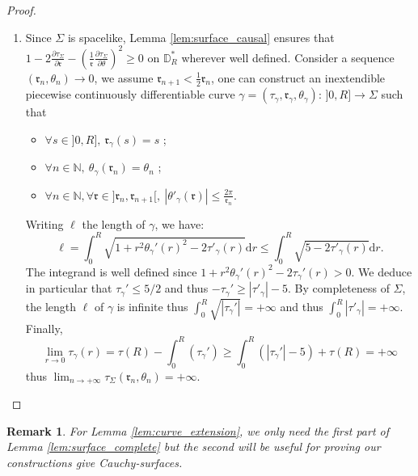 \documentclass[a4paper,12pt]{article}
\def\r{\mathfrak{r}}
\def\N{\mathbb N}
\def\d{\mathrm{d}}
\newtheorem{remark}{Remark}             %
\begin{document}
\begin{proof}
\begin{enumerate}
	
     
   \item    Since $\Sigma$ is spacelike,  Lemma \ref{lem:surface_causal} ensures that 
      $1-2\frac{\partial \tau_\Sigma}{\partial \r}-
      \left(\frac{1}{\r} \frac{\partial \tau_\Sigma}{\partial \theta}\right)^2 \geq 0$
      on $\mathbb D_R^*$ wherever well defined. Consider a sequence $(\r_n,\theta_n)\rightarrow 0$, we assume $\r_{n+1}<\frac{1}{2}\r_{n}$, one can construct
      an inextendible piecewise continuously differentiable curve $\gamma=(\tau_\gamma,\r_\gamma,\theta_\gamma):\,]0,R]\xrightarrow{~~} \Sigma$ such that
      \begin{itemize}
       \item  $\forall s\in ]0,R],~\r_\gamma(s)=s$ ;
       \item  $\forall n\in \N,~\theta_\gamma(\r_n)=\theta_n$ ;
       \item  $\forall n\in\N, \forall \r\in ]\r_n,\r_{n+1}[,~ |\theta'_\gamma(\r)|\leq \frac{2\pi}{\r_n} $.
      \end{itemize}		
      Writing $\ell$ the length of $\gamma$, we have:
      $$
      \ell = \int_{0}^{R} \sqrt{1+r^2\theta_\gamma'(r)^2-2 \tau'_\gamma(r)}\d r
       \leq  \int_{0}^{R} \sqrt{5-2 \tau'_\gamma(r)} \d r .
      $$
      The integrand is well defined since  $1+r^2\theta_\gamma'(r)^2-2 \tau_\gamma'(r)>0$. 
      We deduce in particular that $\tau_\gamma'\leq 5/2$ and thus $-\tau_\gamma'\geq |\tau'_\gamma|-5$. By completeness of $\Sigma$, the length $\ell$ of $\gamma$ is infinite thus 
      $\int_{0}^{R}\sqrt{|\tau_\gamma'|}=+\infty$ and thus $\int_0^{R}|\tau'_\gamma|=+\infty$.
      Finally, 
      $$\lim_{r\rightarrow 0}\tau_\gamma (r)=\tau(R)-\int_0^R\left(\tau_\gamma'\right) \geq \int_0^{R}\left(|\tau_\gamma'| -5\right)+\tau(R)=+\infty$$ 
thus    $\lim_{n\rightarrow +\infty}{\tau_\Sigma(\r_n,\theta_n)}=+\infty$.
      
      
        \end{enumerate}
      \end{proof}
    \begin{remark}
     For Lemma \ref{lem:curve_extension}, we only need the first part of Lemma \ref{lem:surface_complete} but the second will be useful for proving our constructions give Cauchy-surfaces. 
    \end{remark}
\end{document}
